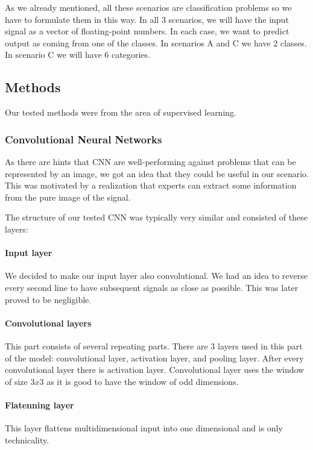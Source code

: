 As we already mentioned, all these scenarios are classification problems so we have
to formulate them in this way. In all 3 scenarios, we will have the input signal as a
vector of floating-point numbers. In each case, we want to predict output as coming
from one of the classes. In scenarios A and C we have 2 classes. In scenario C we
will have 6 categories.

\subsection{Methods}

Our tested methods were from the area of supervised learning.

\subsubsection{Convolutional Neural Networks}

As there are hints that CNN are well-performing against problems that can be
represented by an image, we got an idea that they could be useful in our scenario.
This was motivated by a realization that experts can extract some information from
the pure image of the signal.

The structure of our tested CNN was typically very similar and consisted of these
layers:

\paragraph{Input layer}
We decided to make our input layer also convolutional. We had an idea to reverse
every second line to have subsequent signals as close as possible. This was later
proved to be negligible.

\paragraph{Convolutional layers}
This part consists of several repeating parts. There are 3 layers used in
this part of the model: convolutional layer, activation layer, and pooling layer.
After every convolutional layer there is activation layer. Convolutional layer uses
the window of size $3x3$ as it is good to have the window of odd dimensions.

\paragraph{Flatenning layer}
This layer flattens multidimensional input into one dimensional and is only technicality.

